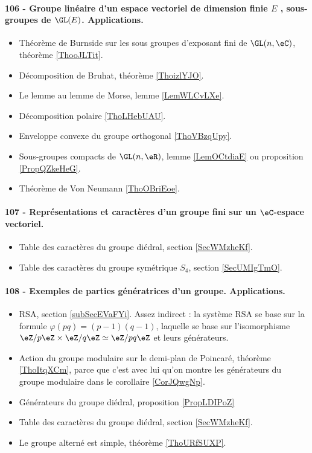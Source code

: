 \paragraph{106 - Groupe linéaire d’un espace vectoriel de dimension finie $E$ , sous-groupes de $\GL(E)$. Applications.}
\begin{itemize}
    \item Théorème de Burnside sur les sous groupes d'exposant fini de \( \GL(n,\eC)\), théorème \ref{ThooJLTit}.
    \item Décomposition de Bruhat, théorème \ref{ThoizlYJO}.
    \item Le lemme au lemme de Morse, lemme \ref{LemWLCvLXe}.
    \item Décomposition polaire \ref{ThoLHebUAU}.
    \item Enveloppe convexe du groupe orthogonal \ref{ThoVBzqUpy}.
    \item Sous-groupes compacts de \( \GL(n,\eR)\), lemme \ref{LemOCtdiaE} ou proposition \ref{PropQZkeHeG}.
    \item Théorème de Von Neumann \ref{ThoOBriEoe}.
\end{itemize}
\paragraph{107 - Représentations et caractères d’un groupe fini sur un \( \eC\)-espace vectoriel.}
\begin{itemize}
    \item Table des caractères du groupe diédral, section \ref{SecWMzheKf}.
    \item Table des caractères du groupe symétrique \( S_4\), section \ref{SecUMIgTmO}.
\end{itemize}
\paragraph{108 - Exemples de parties génératrices d’un groupe. Applications.}
\begin{itemize}
    \item RSA, section \ref{subSecEVaFYi}. Assez indirect : la système RSA se base sur la formule \( \varphi(pq)=(p-1)(q-1)\), laquelle se base sur l'isomorphisme \( \eZ/p\eZ\times \eZ/q\eZ\simeq \eZ/pq\eZ\) et leurs générateurs.
    \item Action du groupe modulaire sur le demi-plan de Poincaré, théorème \ref{ThoItqXCm}, parce que c'est avec lui qu'on montre les générateurs du groupe modulaire dans le corollaire \ref{CorJQwgNp}.
    \item Générateurs du groupe diédral, proposition \ref{PropLDIPoZ}
    \item Table des caractères du groupe diédral, section \ref{SecWMzheKf}.
    \item Le groupe alterné est simple, théorème \ref{ThoURfSUXP}.
\end{itemize}

